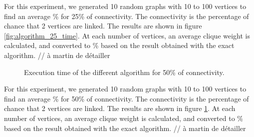 For this experiment, we generated 10 random graphs with 10 to 100 vertices to find an
average \% for 25\% of connectivity. The connectivity is the percentage
of chance that 2 vertices are linked. The results are shown in figure \ref{fig:algorithm_25_time}. At each number of
vertices, an average clique weight is calculated, and converted to \% based on the result obtained with the exact algorithm.
// à martin de détailler

\begin{figure}[H]
    \centering
    \caption{Execution time of the different algorithm for 50\% of connectivity.}
    \label{fig:algorithm_50_time}
\end{figure}

For this experiment, we generated 10 random graphs with 10 to 100 vertices to find an
average \% for 50\% of connectivity. The connectivity is the percentage
of chance that 2 vertices are linked. The results are shown in figure \ref{fig:algorithm_50_time}. At each number of
vertices, an average clique weight is calculated, and converted to \% based on the result obtained with the exact algorithm.
// à martin de détailler

